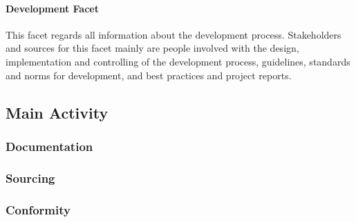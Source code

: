 \paragraph*{Development Facet}
This facet regards all information about the development process. Stakeholders and sources for this facet mainly are people involved with the design, implementation and controlling of the development process, guidelines, standards and norms for development, and best practices and project reports. \parencite[cf.][79]{Pohl.2007}
\subsection{Main Activity}

\subsubsection*{Documentation}
\subsubsection*{Sourcing}
\subsubsection*{Conformity}
